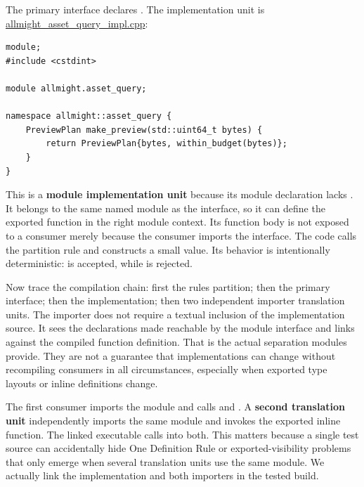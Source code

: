 The primary interface declares . The implementation unit is \hyperref[source-file-26fa02737266a08f013cdbb5]{allmight\_asset\_query\_impl.cpp}:

\begin{verbatim}
module;
#include <cstdint>

module allmight.asset_query;

namespace allmight::asset_query {
    PreviewPlan make_preview(std::uint64_t bytes) {
        return PreviewPlan{bytes, within_budget(bytes)};
    }
}
\end{verbatim}

This is a \textbf{module implementation unit} because its module declaration lacks . It belongs to the same named module as the interface, so it can define the exported function in the right module context. Its function body is not exposed to a consumer merely because the consumer imports the interface. The code calls the partition rule and constructs a small value. Its behavior is intentionally deterministic:  is accepted, while  is rejected.

Now trace the compilation chain: first the rules partition; then the primary interface; then the implementation; then two independent importer translation units. The importer does not require a textual inclusion of the implementation source. It sees the declarations made reachable by the module interface and links against the compiled function definition. That is the actual separation modules provide. They are not a guarantee that implementations can change without recompiling consumers in all circumstances, especially when exported type layouts or inline definitions change.

The first consumer imports the module and calls  and . A \textbf{second translation unit} independently imports the same module and invokes the exported inline function. The linked executable calls into both. This matters because a single test source can accidentally hide One Definition Rule or exported-visibility problems that only emerge when several translation units use the same module. We actually link the implementation and both importers in the tested build.

